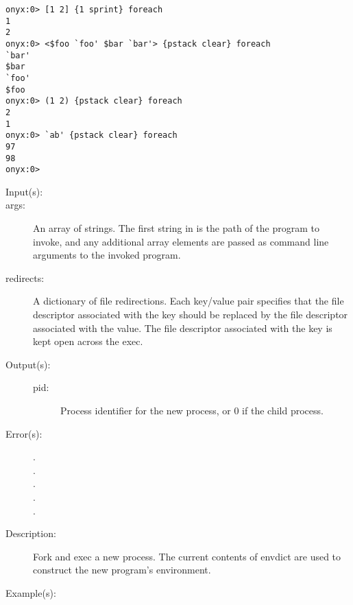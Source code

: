 \begin{description}
\begin{description}
\begin{verbatim}
onyx:0> [1 2] {1 sprint} foreach
1
2
onyx:0> <$foo `foo' $bar `bar'> {pstack clear} foreach
`bar'
$bar
`foo'
$foo
onyx:0> (1 2) {pstack clear} foreach
2
1
onyx:0> `ab' {pstack clear} foreach
97
98
onyx:0>
		\end{verbatim}
	\end{description}
\label{systemdict:forkexec}
\item[{\onyxop{args}{forkexec}{pid}}: ]
\item[{\onyxop{args redirects}{forkexec}{pid}}: ]
	\begin{description}\item[]
	\item[Input(s): ]
		\item[args: ]
			An array of strings.  The first string in 
			is the path of the program to invoke, and any additional
			array elements are passed as command line arguments to
			the invoked program.
		\item[redirects: ]
			A dictionary of file redirections.  Each key/value pair
			specifies that the file descriptor associated with the
			key should be replaced by the file descriptor associated
			with the value.  The file descriptor associated with the
			key is kept open across the exec.
	\item[Output(s): ]
		\begin{description}\item[]
		\item[pid: ]
			Process identifier for the new process, or 0 if the
			child process.
		\end{description}
	\item[Error(s): ]
		\begin{description}\item[]
		\item[.]
		\item[.]
		\item[.]
		\item[.]
		\item[.]
		\end{description}
	\item[Description: ]
		Fork and exec a new process.  The current contents of envdict
		are used to construct the new program's environment.
	\item[Example(s): ]\begin{verbatim}


\end{verbatim}
\end{description}
\end{description}
